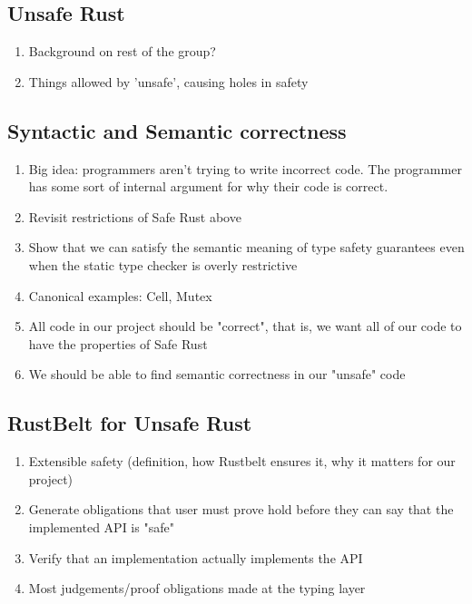 \documentclass[12pt]{article}
\begin{document}
\subsection{Unsafe Rust}
\begin{enumerate}
    \item Background on rest of the group?
    \item Things allowed by 'unsafe', causing holes in safety
\end{enumerate}

\subsection{Syntactic and Semantic correctness}
\begin{enumerate}
    \item Big idea: programmers aren't trying to write incorrect code. The programmer has some sort of internal argument for why their code is correct.
    \item Revisit restrictions of Safe Rust above
    \item Show that we can satisfy the semantic meaning of type safety guarantees even when the static type checker is overly restrictive
    \item Canonical examples: Cell, Mutex
    \item All code in our project should be "correct", that is, we want all of our code to have the properties of Safe Rust
    \item We should be able to find semantic correctness in our "unsafe" code
\end{enumerate}

\subsection{RustBelt for Unsafe Rust}
\begin{enumerate}
    \item Extensible safety (definition, how Rustbelt ensures it, why it matters for our project)
    \item Generate obligations that user must prove hold before they can say that the implemented API is "safe"
    \item Verify that an implementation actually implements the API
    \item Most judgements/proof obligations made at the typing layer
\end{enumerate}
\end{document}
